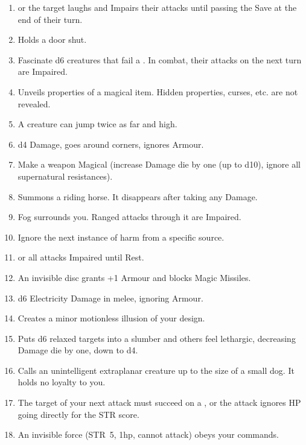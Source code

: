 \documentclass[itdr]{subfiles}
\begin{document}
\begin{enumerate}
	\item {}  or the target laughs and Impairs their attacks until passing the Save at the end of their turn.
	\item {} Holds a door shut.
	\item {} Fascinate d6 creatures that fail a . In combat, their attacks on the next turn are Impaired.
	\vfill
	\break
	\item {} Unveils properties of a magical item. Hidden properties, curses, etc. are not revealed.
	\item {} A creature can jump twice as far and high.
	\item {} d4 Damage, goes around corners, ignores Armour.
	\item {} Make a weapon Magical (increase Damage die by one (up to d10), ignore all supernatural resistances).
	\item {} Summons a riding horse. It disappears after taking any Damage.
	\item {} Fog surrounds you. Ranged attacks through it are Impaired.
	\item {} Ignore the next instance of harm from a specific source.
	\item {}  or all attacks Impaired until Rest.
	\item {} An invisible disc grants +1 Armour and blocks Magic Missiles.
	\item {} d6 Electricity Damage in melee, ignoring Armour.
	\item {} Creates a minor motionless \mbox{illusion} of your design.
	\item {} Puts d6 relaxed targets into a slumber and others feel lethargic, decreasing Damage die by one, down to d4.
	\item {} Calls an unintelligent extraplanar creature up to the size of a small dog. It holds no loyalty to you.
	\item {} The target of your next attack must succeed on a , or the attack ignores HP going directly for the STR score.
	\item {} An invisible force (STR~5, 1hp, cannot attack) obeys your commands.
\end{enumerate}
\end{document}
